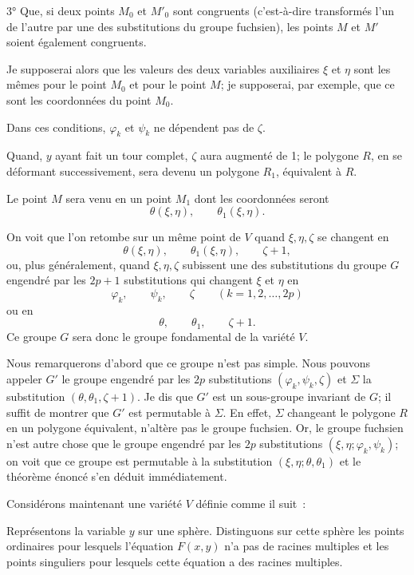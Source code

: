 \documentclass{article}
\begin{document}
3° Que, si deux points $M_{0}$ et $M'_{0}$ sont congruents (c'est-à-dire transformés l'un de l'autre par une des substitutions du groupe fuchsien), les points $M$ et $M'$ soient également congruents.

Je supposerai alors que les valeurs des deux variables auxiliaires $\xi$ et $\eta$ sont les mêmes pour le point $M_{0}$ et pour le point $M$; je supposerai, par exemple, que ce sont les coordonnées du point $M_{0}$.

Dans ces conditions, $\varphi_{k}$ et $\psi_{k}$ ne dépendent pas de $\zeta$.

Quand, $y$ ayant fait un tour complet, $\zeta$ aura augmenté de 1; le polygone $R$, en se déformant successivement, sera devenu un polygone $R_{1}$, équivalent à $R$.

Le point $M$ sera venu en un point $M_{1}$ dont les coordonnées seront
\[ \theta(\xi, \eta), \qquad \theta_{1}(\xi, \eta). \]

On voit que l'on retombe sur un même point de $V$ quand $\xi, \eta, \zeta$ se changent en
\[ \theta(\xi, \eta), \qquad \theta_{1}(\xi, \eta), \qquad \zeta + 1, \]
ou, plus généralement, quand $\xi, \eta, \zeta$ subissent une des substitutions du groupe $G$ engendré par les $2p + 1$ substitutions qui changent $\xi$ et $\eta$ en
\[ \varphi_{k}, \qquad \psi_{k}, \qquad \zeta \qquad (k = 1, 2, \ldots, 2p) \]
ou en
\[ \theta, \qquad \theta_{1}, \qquad \zeta + 1. \]
Ce groupe $G$ sera donc le groupe fondamental de la variété $V$.

Nous remarquerons d'abord que ce groupe n'est pas simple. Nous pouvons appeler $G'$ le groupe engendré par les $2p$ substitutions $(\varphi_{k}, \psi_{k}, \zeta)$ et $\Sigma$ la substitution $(\theta, \theta_{1}, \zeta + 1)$. Je dis que $G'$ est un sous-groupe invariant de $G$; il suffit de montrer que $G'$ est permutable à $\Sigma$. En effet, $\Sigma$ changeant le polygone $R$ en un polygone équivalent, n'altère pas le groupe fuchsien. Or, le groupe fuchsien n'est autre chose que le groupe engendré par les $2p$ substitutions $(\xi, \eta; \varphi_{k}, \psi_{k})$; on voit que ce groupe est permutable à la substitution $(\xi, \eta; \theta, \theta_{1})$ et le théorème énoncé s'en déduit immédiatement.

Considérons maintenant une variété $V$ définie comme il suit~:

Représentons la variable $y$ sur une sphère. Distinguons sur cette sphère les points ordinaires pour lesquels l'équation $F(x, y)$ n'a pas de racines multiples et les points singuliers pour lesquels cette équation a des racines multiples.
\end{document}
